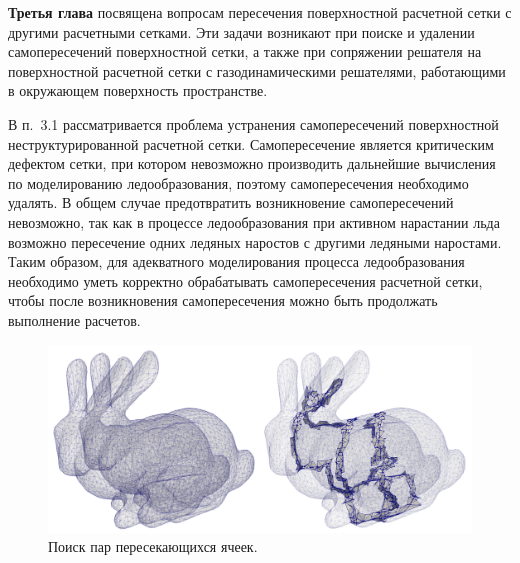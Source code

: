 \documentclass[a4paper,14pt]{extarticle}                     %
\theoremstyle{plain}                                         %
\begin{document}

\newpage
\textbf{Третья глава} посвящена вопросам пересечения поверхностной расчетной сетки с другими расчетными сетками.
Эти задачи возникают при поиске и удалении самопересечений поверхностной сетки, а также при сопряжении решателя на поверхностной расчетной сетки с газодинамическими решателями, работающими в окружающем поверхность пространстве.

В п.~3.1 рассматривается проблема устранения самопересечений поверхностной неструктурированной расчетной сетки.
Самопересечение является критическим дефектом сетки, при котором невозможно производить дальнейшие вычисления по моделированию ледообразования, поэтому самопересечения необходимо удалять.
В общем случае предотвратить возникновение самопересечений невозможно, так как в процессе ледообразования при активном нарастании льда возможно пересечение одних ледяных наростов с другими ледяными наростами.
Таким образом, для адекватного моделирования процесса ледообразования необходимо уметь корректно обрабатывать самопересечения расчетной сетки, чтобы после возникновения самопересечения можно быть продолжать выполнение расчетов.

\begin{figure}[!ht]
\centering
\includegraphics[width=1.0\textwidth]{./pics/text_1_int/bunnies_dbl.png}
\singlespacing
\caption{Поиск пар пересекающихся ячеек.}
\label{fig:text_1_int_1}
\end{figure}
\end{document}
